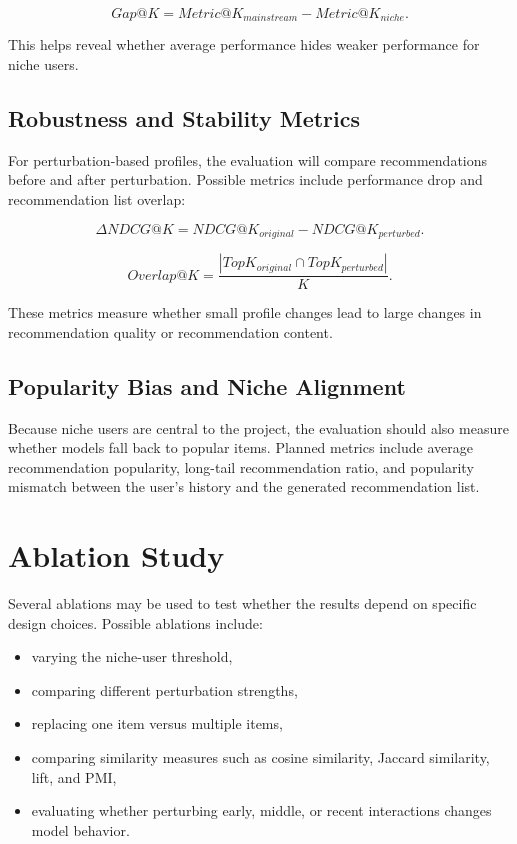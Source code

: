\documentclass[sigconf]{acmart}
\begin{document}
\begin{equation}
  Gap@K = Metric@K_{mainstream} - Metric@K_{niche}.
\end{equation}

This helps reveal whether average performance hides weaker performance for niche users.

\subsection{Robustness and Stability Metrics}
For perturbation-based profiles, the evaluation will compare recommendations before and after perturbation. Possible metrics include performance drop and recommendation list overlap:

\begin{equation}
  \Delta NDCG@K = NDCG@K_{original} - NDCG@K_{perturbed}.
\end{equation}

\begin{equation}
  Overlap@K = \frac{|TopK_{original} \cap TopK_{perturbed}|}{K}.
\end{equation}

These metrics measure whether small profile changes lead to large changes in recommendation quality or recommendation content.

\subsection{Popularity Bias and Niche Alignment}
Because niche users are central to the project, the evaluation should also measure whether models fall back to popular items. Planned metrics include average recommendation popularity, long-tail recommendation ratio, and popularity mismatch between the user's history and the generated recommendation list.

\section{Ablation Study}
Several ablations may be used to test whether the results depend on specific design choices. Possible ablations include:

\begin{itemize}
  \item varying the niche-user threshold,
  \item comparing different perturbation strengths,
  \item replacing one item versus multiple items,
  \item comparing similarity measures such as cosine similarity, Jaccard similarity, lift, and PMI,
  \item evaluating whether perturbing early, middle, or recent interactions changes model behavior.
\end{itemize}
\end{document}
